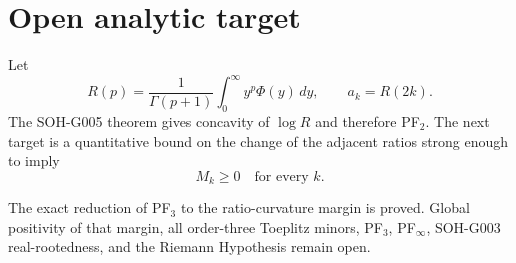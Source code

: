 \section{Open analytic target}

Let
\[
R(p)=\frac{1}{\Gamma(p+1)}\int_0^\infty y^p\Phi(y)\,dy,
\qquad a_k=R(2k).
\]
The SOH-G005 theorem gives concavity of $\log R$ and therefore PF$_2$.  The next target is a quantitative bound on the change of the adjacent ratios strong enough to imply
\[
M_k\ge0\quad\text{for every }k.
\]

\begin{warning}
The exact reduction of PF$_3$ to the ratio-curvature margin is proved.  Global positivity of that margin, all order-three Toeplitz minors, PF$_3$, PF$_\infty$, SOH-G003 real-rootedness, and the Riemann Hypothesis remain open.
\end{warning}
